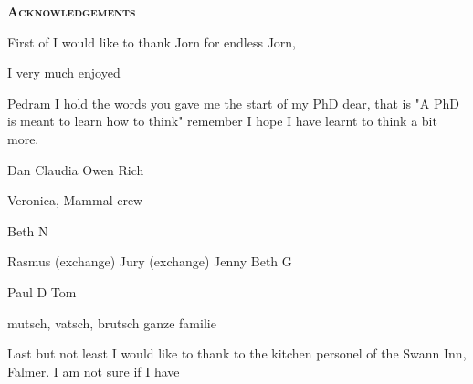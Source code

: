 \pagestyle{empty}%
\begin{center}
	\Huge \textsc{\textbf{Acknowledgements}}
	\hrulefill
\end{center}

First of I would like to thank Jorn for endless Jorn, 

I very much enjoyed 

Pedram
I hold the words you gave me the start of my PhD dear, that is "A PhD is meant to learn how to think"
remember 
I hope I have learnt to think a bit more.


Dan
Claudia
Owen
Rich

Veronica, Mammal crew

Beth N

Rasmus (exchange)
Jury (exchange)
Jenny
Beth G

Paul D
Tom


mutsch, vatsch, brutsch
ganze familie

Last but not least I would like to thank to the kitchen personel of the Swann Inn, Falmer. 
I am not sure if I have 